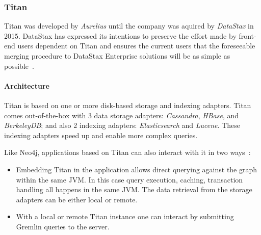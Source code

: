 \subsubsection{Titan}
\label{sect:titan}

Titan was developed by \emph{Aurelius} until the company was aquired by \emph{DataStax} in 2015. DataStax has expressed its intentions to preserve the effort made by front-end users dependent on Titan and ensures the current users that the foreseeable merging procedure to DataStax Enterprise solutions will be as simple as possible~\cite{titan-datastax-acquirement}.

\paragraph{Architecture}

Titan is based on one or more disk-based storage and indexing adapters. Titan comes out-of-the-box with 3 data storage adapters: \emph{Cassandra}, \emph{HBase}, and \emph{BerkeleyDB}; and also 2 indexing adapters: \emph{Elasticsearch} and \emph{Lucene}. These indexing adapters speed up and enable more complex queries.

Like Neo4j, applications based on Titan can also interact with it in two ways~\cite{titan-arch}:
\begin{itemize}[topsep=0pt]
  \item Embedding Titan in the application allows direct querying against the graph within the same JVM. In this case query execution, caching, transaction handling all happens in the same JVM. The data retrieval from the storage adapters can be either local or remote.
  \item With a local or remote Titan instance one can interact by submitting Gremlin queries to the server.
\end{itemize}


